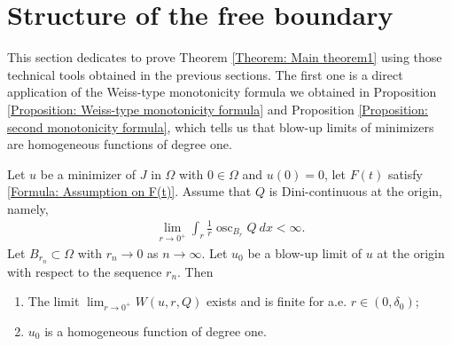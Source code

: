 \documentclass[11pt,reqno]{amsart}
\begin{document}
\section{Structure of the free boundary}
This section dedicates to prove Theorem \ref{Theorem: Main theorem1} using those technical tools obtained in the previous sections. The first one is a direct application of the Weiss-type monotonicity formula we obtained in Proposition \ref{Proposition: Weiss-type monotonicity formula} and Proposition \ref{Proposition: second monotonicity formula}, which tells us that blow-up limits of minimizers are homogeneous functions of degree one.
\begin{proposition}\label{Proposition: Homogeneity of blow-up limits}
	Let $u$ be a minimizer of $J$ in $\Omega$ with $0\in\Omega$ and $u(0)=0$, let $F(t)$ satisfy \eqref{Formula: Assumption on F(t)}. Assume that $Q$ is Dini-continuous at the origin, namely,
	\begin{align}\label{Formula: S(0)}
		\lim_{r\to0^{+}}\int_{r}\frac{1}{r}\operatorname{osc}_{B_{r}}Q\:dx<\infty.
	\end{align}
	Let $B_{r_{n}}\subset\Omega$ with $r_{n}\to0$ as $n\to\infty$. Let $u_{0}$ be a blow-up limit of $u$ at the origin with respect to the sequence $r_{n}$. Then
	\begin{enumerate}
		\item The limit $\lim_{r\to0^{+}}W(u,r,Q)$ exists and is finite for a.e. $r\in(0,\delta_{0})$;
		\item $u_{0}$ is a homogeneous function of degree one.
	\end{enumerate}
\end{proposition}
\end{document}
